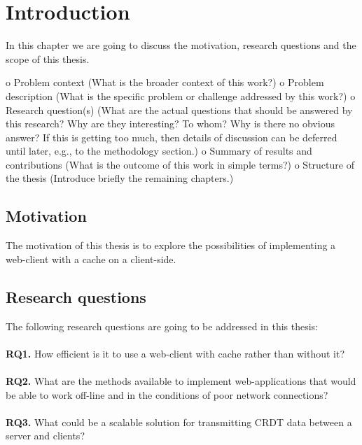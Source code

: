 \chapter{Introduction}
\label{Introduction}

In this chapter we are going to discuss the motivation, research questions and the scope of this thesis.

o Problem context (What is the broader context of this work?) 
o Problem description (What is the specific problem or challenge addressed by this work?) 
o Research question(s) (What are the actual questions that should be answered by this research? Why are they interesting? To whom? Why is there no obvious answer? If this is getting too much, then details of discussion can be deferred until later, e.g., to the methodology section.) 
o Summary of results and contributions (What is the outcome of this work in simple terms?) 
o Structure of the thesis (Introduce briefly the remaining chapters.)

\section{Motivation}

The motivation of this thesis is to explore the possibilities of implementing a web-client with a cache on a client-side. 

\section{Research questions}

The following research questions are going to be addressed in this thesis:
\\\\
\textbf{RQ1.} How efficient is it to use a web-client with cache rather than without it?
\\\\
\textbf{RQ2.} What are the methods available to implement web-applications that would be able to work off-line and in the conditions of poor network connections?
\\\\
\textbf{RQ3.} What could be a scalable solution for transmitting CRDT data between a server and clients?
